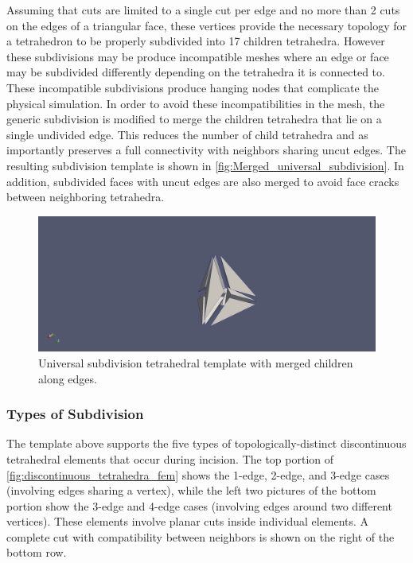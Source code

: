 Assuming that cuts are limited to a single cut per edge and no more than 2 cuts on the edges of a triangular face, these vertices provide the necessary topology for a tetrahedron to be properly subdivided into 17 children tetrahedra. However these subdivisions may be produce incompatible meshes where an edge or face may be subdivided differently depending on the tetrahedra it is connected to. These incompatible subdivisions produce hanging nodes that complicate the physical simulation. In order to avoid these incompatibilities in the mesh, the generic subdivision is modified to merge the children tetrahedra that lie on a single undivided edge. This reduces the number of child tetrahedra and as importantly preserves a full connectivity with neighbors sharing uncut edges. The resulting subdivision template is shown in \autoref{fig:Merged_universal_subdivision}. In addition, subdivided faces with uncut edges are also merged to avoid face cracks between neighboring tetrahedra.

\begin{figure}
  \centering%
  \includegraphics[width=0.85\linewidth]{figures/cutting/Merged_universal.png}
  \caption{Universal subdivision tetrahedral template with merged children along edges.}\label{fig:Merged_universal_subdivision}
\end{figure}


\subsubsection{Types of Subdivision}

The template above supports the five types of topologically-distinct discontinuous tetrahedral elements that occur during incision. The top portion of \autoref{fig:discontinuous_tetrahedra_fem} shows the 1-edge, 2-edge, and 3-edge cases (involving edges sharing a vertex), while the left two pictures of the bottom portion show the 3-edge and 4-edge cases (involving edges around two different vertices). These elements involve planar cuts inside individual elements. A complete cut with compatibility between neighbors is shown on the right of the bottom row.

